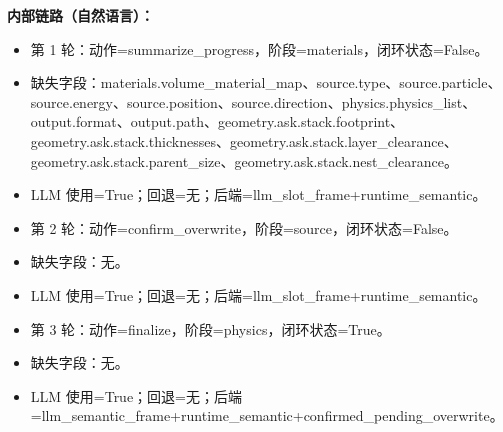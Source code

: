 \documentclass[11pt]{ctexart}
\begin{document}
\textbf{内部链路（自然语言）：}
\begin{itemize}
\item 第 1 轮：动作=summarize\_progress，阶段=materials，闭环状态=False。
\item 缺失字段：materials.volume\_material\_map、source.type、source.particle、source.energy、source.position、source.direction、physics.physics\_list、output.format、output.path、geometry.ask.stack.footprint、geometry.ask.stack.thicknesses、geometry.ask.stack.layer\_clearance、geometry.ask.stack.parent\_size、geometry.ask.stack.nest\_clearance。
\item LLM 使用=True；回退=无；后端=llm\_slot\_frame+runtime\_semantic。
\item 第 2 轮：动作=confirm\_overwrite，阶段=source，闭环状态=False。
\item 缺失字段：无。
\item LLM 使用=True；回退=无；后端=llm\_slot\_frame+runtime\_semantic。
\item 第 3 轮：动作=finalize，阶段=physics，闭环状态=True。
\item 缺失字段：无。
\item LLM 使用=True；回退=无；后端=llm\_semantic\_frame+runtime\_semantic+confirmed\_pending\_overwrite。
\end{itemize}
\end{document}
